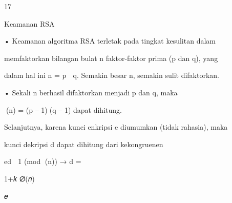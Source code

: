 \documentclass{article}
\begin{document}

17

Keamanan RSA

• Keamanan algoritma RSA terletak pada tingkat kesulitan dalam 

memfaktorkan bilangan bulat n faktor-faktor prima (p dan q), yang 

dalam hal ini n = p  q.  Semakin besar n, semakin sulit difaktorkan.

• Sekali n berhasil difaktorkan menjadi p dan q, maka


 (n) = (p – 1)(q – 1) dapat dihitung.

   Selanjutnya, karena kunci enkripsi e diumumkan (tidak rahasia), maka

   kunci dekripsi d dapat dihitung dari kekongruenen

            ed  1 (mod (n)) → d =

1+𝑘 ∅(𝑛)

𝑒
\end{document}
